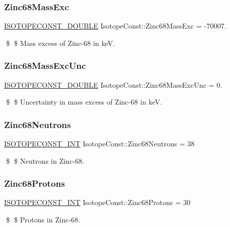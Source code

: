 \subsubsection{\texorpdfstring{Zinc68\+Mass\+Exc}{Zinc68MassExc}}
{\footnotesize\ttfamily \mbox{\hyperlink{group___isotope_const-_macros_ga8f45a7272ce02c0b4c65c44636ed719a}{I\+S\+O\+T\+O\+P\+E\+C\+O\+N\+S\+T\+\_\+\+D\+O\+U\+B\+LE}} Isotope\+Const\+::\+Zinc68\+Mass\+Exc = -\/70007.}

\$ \$ Mass excess of Zinc-\/68 in keV. \mbox{\label{group___isotope_const-_zinc-_zn68_ga33f4fe8481223e0fe535feb3f9d61e3e}} 
\subsubsection{\texorpdfstring{Zinc68\+Mass\+Exc\+Unc}{Zinc68MassExcUnc}}
{\footnotesize\ttfamily \mbox{\hyperlink{group___isotope_const-_macros_ga8f45a7272ce02c0b4c65c44636ed719a}{I\+S\+O\+T\+O\+P\+E\+C\+O\+N\+S\+T\+\_\+\+D\+O\+U\+B\+LE}} Isotope\+Const\+::\+Zinc68\+Mass\+Exc\+Unc = 0.}

\$ \$ Uncertainty in mass excess of Zinc-\/68 in keV. \mbox{\label{group___isotope_const-_zinc-_zn68_gadd499c293eb24eb68d8f73e99e899edc}} 
\subsubsection{\texorpdfstring{Zinc68\+Neutrons}{Zinc68Neutrons}}
{\footnotesize\ttfamily \mbox{\hyperlink{group___isotope_const-_macros_ga5f18360b3e99483a35c32d789e62621c}{I\+S\+O\+T\+O\+P\+E\+C\+O\+N\+S\+T\+\_\+\+I\+NT}} Isotope\+Const\+::\+Zinc68\+Neutrons = 38}

\$ \$ Neutrons in Zinc-\/68. \mbox{\label{group___isotope_const-_zinc-_zn68_gac758fe24f7d665b3745768df642eba96}} 
\subsubsection{\texorpdfstring{Zinc68\+Protons}{Zinc68Protons}}
{\footnotesize\ttfamily \mbox{\hyperlink{group___isotope_const-_macros_ga5f18360b3e99483a35c32d789e62621c}{I\+S\+O\+T\+O\+P\+E\+C\+O\+N\+S\+T\+\_\+\+I\+NT}} Isotope\+Const\+::\+Zinc68\+Protons = 30}

\$ \$ Protons in Zinc-\/68. 